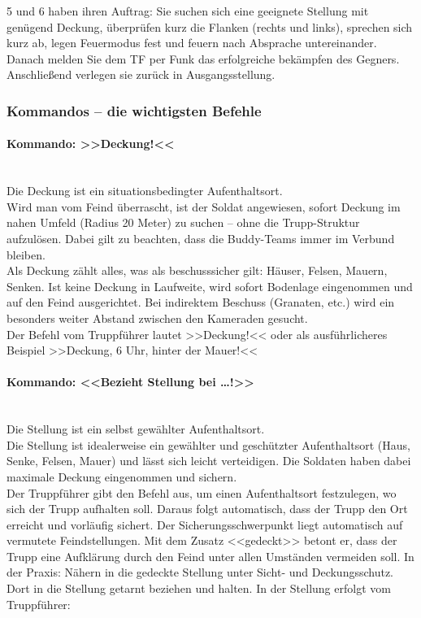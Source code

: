 5 und 6 haben ihren Auftrag: Sie suchen sich eine geeignete Stellung mit genügend Deckung, überprüfen kurz die Flanken (rechts und links), sprechen sich kurz ab, legen Feuermodus fest und feuern nach Absprache untereinander. Danach melden Sie dem TF per Funk das erfolgreiche bekämpfen des Gegners. Anschließend verlegen sie zurück in Ausgangsstellung. 
  
\subsubsection{Kommandos -- die wichtigsten Befehle}
\label{sec:kommando}
\paragraph*{Kommando: >>Deckung!<<}\hfil\\
	Die Deckung ist ein situationsbedingter Aufenthaltsort.\\ 
	Wird man vom Feind überrascht, ist der Soldat angewiesen, sofort Deckung im nahen Umfeld (Radius 20 Meter) zu suchen – ohne die Trupp-Struktur aufzulösen. Dabei gilt zu beachten, dass die Buddy-Teams immer im Verbund bleiben. \\
	Als Deckung zählt alles, was als beschusssicher gilt: Häuser, Felsen, Mauern, Senken. Ist keine Deckung in Laufweite, wird sofort Bodenlage eingenommen und auf den Feind ausgerichtet. Bei indirektem Beschuss (Granaten, etc.) wird ein besonders weiter Abstand zwischen den Kameraden gesucht.\\

	Der Befehl vom Truppführer lautet >>Deckung!<< oder als ausführlicheres Beispiel >>Deckung, 6 Uhr, hinter der Mauer!<<

\paragraph*{Kommando: <<Bezieht Stellung bei \dots!>>}\ \\
	Die Stellung ist ein selbst gewählter Aufenthaltsort. \\
	Die Stellung ist idealerweise ein gewählter und geschützter Aufenthaltsort (Haus, Senke, Felsen, Mauer) und lässt sich leicht verteidigen. Die Soldaten haben dabei maximale Deckung eingenommen und sichern. \\
	Der Truppführer gibt den Befehl aus, um einen Aufenthaltsort festzulegen, wo sich der Trupp aufhalten soll. Daraus folgt automatisch, dass der Trupp den Ort erreicht und vorläufig sichert. Der Sicherungsschwerpunkt liegt automatisch auf vermutete Feindstellungen. Mit dem Zusatz <<gedeckt>> betont er, dass der Trupp eine Aufklärung durch den Feind unter allen Umständen vermeiden soll. In der Praxis: Nähern in die gedeckte Stellung unter Sicht- und Deckungsschutz. Dort in die Stellung getarnt beziehen und halten. In der Stellung erfolgt vom Truppführer:

